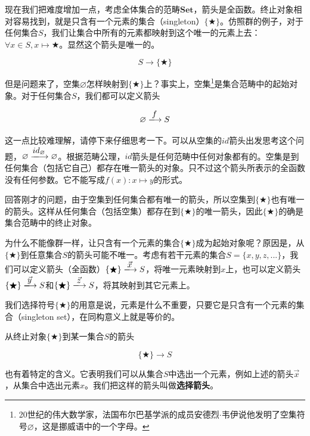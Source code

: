 \documentclass[b5paper]{ctexart}
\begin{document}
\begin{example}
现在我们把难度增加一点，考虑全体集合的范畴$\pmb{Set}$，箭头是全函数。终止对象相对容易找到，就是只含有一个元素的集合（singleton）$\{ \bigstar \}$。仿照群的例子，对于任何集合$S$，我们让集合中所有的元素都映射到这个唯一的元素上去：$\forall x \in S, x \mapsto \bigstar$。显然这个箭头是唯一的。

\[
  S \longrightarrow \{ \bigstar \}
\]

但是问题来了，空集$\varnothing$怎样映射到$\{ \bigstar \}$上？事实上，空集\footnote{20世纪的伟大数学家，法国布尔巴基学派的成员安德烈$\cdot$韦伊说他发明了空集符号$\varnothing$，这是挪威语中的一个字母。}是集合范畴中的起始对象。对于任何集合$S$，我们都可以定义箭头

\[
  \varnothing \arrowto{f} S
\]

这一点比较难理解，请停下来仔细思考一下。可以从空集的$id$箭头出发思考这个问题，$\varnothing \arrowto{id_{\varnothing}} \varnothing$。根据范畴公理，$id$箭头是任何范畴中任何对象都有的。空集是到任何集合（包括它自己）都存在唯一箭头的对象。只不过这个箭头所表示的全函数没有任何参数。它不能写成$f(x): x \mapsto y$的形式。

回答刚才的问题，由于空集到任何集合都有唯一的箭头，所以空集到$\{ \bigstar \}$也有唯一的箭头。这样从任何集合（包括空集）都存在到$\{ \bigstar \}$的唯一箭头，因此$\{ \bigstar \}$的确是集合范畴中的终止对象。

为什么不能像群一样，让只含有一个元素的集合$\{ \bigstar \}$成为起始对象呢？原因是，从$\{ \bigstar \}$到任意集合$S$的箭头可能不唯一。考虑有若干元素的集合$S = \{x, y, z, ...\}$，我们可以定义箭头（全函数）$\{ \bigstar \} \arrowto{\vec{x}} S$，将唯一元素映射到$x$上，也可以定义箭头$\{ \bigstar \} \arrowto{\vec{y}} S$和$\{ \bigstar \} \arrowto{\vec{z}} S$，将其映射到其它元素上。

我们选择符号$\{ \bigstar \}$的用意是说，元素是什么不重要，只要它是只含有一个元素的集合（singleton set），在同构意义上就是等价的。

\label{sec:selection-arrow} 
从终止对象$\{ \bigstar \}$到某一集合$S$的箭头

\[
  \{ \bigstar \} \longrightarrow S
\]

也有着特定的含义。它表明我们可以从集合$S$中选出一个元素，例如上述的箭头$\vec{x}$，从集合中选出元素$x$。我们把这样的箭头叫做\textbf{选择箭头}。
\end{example}
\end{document}
